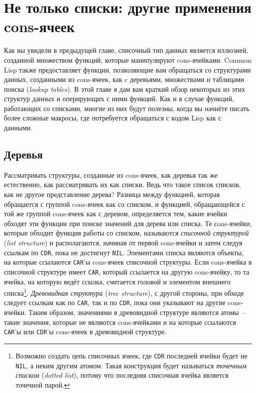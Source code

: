\chapter{Не только списки: другие применения cons-ячеек}
\label{ch:13}

\thispagestyle{empty}

Как вы увидели в предыдущей главе, списочный тип данных является иллюзией, созданной
множеством функций, которые манипулируют cons-ячейками. Common Lisp также предоставляет
функции, позволяющие вам обращаться со структурами данных, созданными из cons-ячеек, как c
деревьями, множествами и таблицами поиска (\textit{lookup tables}). В этой главе я дам
вам краткий обзор некоторых из этих структур данных и оперирующих с ними функций. Как и в
случае функций, работающих со списками, многие из них будут полезны, когда вы начнёте
писать более сложные макросы, где потребуется обращаться с кодом Lisp как с данными.


\section{Деревья}

Рассматривать структуры, созданные из cons-ячеек, как деревья так же естественно, как
рассматривать их как списки. Ведь что такое список списков, как не другое представление
дерева?  Разница между функцией, которая обращается с группой cons-ячеек как со списком, и
функцией, обращающейся с той же группой cons-ячеек как с деревом, определяется тем, какие
ячейки обходят эти функции при поиске значений для дерева или списка. Те сons-ячейки,
которые обходит функция работы со списком, называются \textit{списочной структурой}
(\textit{list structure}) и
располагаются, начиная от первой cons-ячейки и затем следуя ссылкам по \lstinline{CDR}, пока не
достигнут \lstinline{NIL}.  Элементами списка являются объекты, на которые ссылаются
\lstinline{CAR}'ы cons-ячеек списочной структуры. Если cons-ячейка в списочной структуре имеет
\lstinline{CAR}, который ссылается на другую cons-ячейку, то та ячейка, на которую ведёт
ссылка, считается головой и элементом внешнего списка\footnote{Возможно создать цепь
  списочных ячеек, где \lstinline{CDR} последней ячейки будет не \lstinline{NIL}, а неким другим
  атомом. Такая конструкция будет называться \textit{точечным списком} (\textit{dotted
    list}), потому что последняя списочная ячейка является точечной парой.}.
\textit{Древовидная структура} (\textit{tree structure}), с другой стороны, при обходе следует
ссылкам как по \lstinline{CAR}, так и по \lstinline{CDR}, пока они указывают на другие cons-ячейки. Таким
образом, значениями в древовидной структуре являются атомы~-- такие значения, которые не
являются cons-ячейками и на которые ссылаются \lstinline{CAR}'ы или \lstinline{CDR}'ы cons-ячеек в
древовидной структуре.

